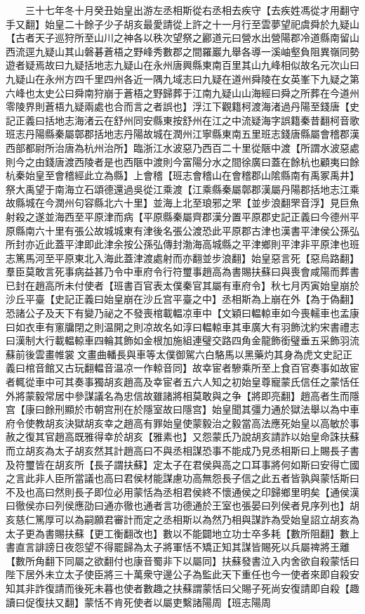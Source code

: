 　　三十七年冬十月癸丑始皇出游左丞相斯從右丞相去疾守【去疾姓馮從才用翻守手又翻】始皇二十餘子少子胡亥最愛請從上許之十一月行至雲夢望祀虞舜於九疑山【古者天子巡狩所至山川之神各以秩次望祭之酈道元曰營水出營陽郡冷道縣南留山西流逕九疑山其山磐碁蒼梧之野峰秀數郡之間羅巖九舉各導一溪岫壑負阻異嶺同勢遊者疑焉故曰九疑括地志九疑山在永州唐興縣東南百里其山九峰相似故名元次山曰九疑山在永州方四千里四州各近一隅九域志曰九疑在道州舜陵在女英峯下九疑之第六峰也太史公曰舜南狩崩于蒼梧之野歸葬于江南九疑山山海經曰舜之所葬在今道州零陵界則蒼梧九疑兩處也合而言之者誤也】浮江下觀籍柯渡海渚過丹陽至錢唐【史記正義曰括地志海渚云在舒州同安縣東按舒州在江之中流疑海字誤籍秦昔翻柯音歌班志丹陽縣秦屬鄣郡括地志丹陽故城在潤州江寧縣東南五里班志錢唐縣屬會稽郡漢西部都尉所治唐為杭州治所】臨浙江水波惡乃西百二十里從陿中渡【所謂水波惡處則今之由錢唐渡西陵者是也西陿中渡則今富陽分水之間徐廣曰蓋在餘杭也顧夷曰餘杭秦始皇至會稽經此立為縣】上會稽【班志會稽山在會稽郡山隂縣南有禹冢禹井】祭大禹望于南海立石頌德還過吳從江乘渡【江乘縣秦屬鄣郡漢屬丹陽郡括地志江乘故縣城在今潤州句容縣北六十里】並海上北至琅邪之罘【並步浪翻罘音浮】見巨魚射殺之遂並海西至平原津而病【平原縣秦屬齊郡漢分置平原郡史記正義曰今德州平原縣南六十里有張公故城城東有津後名張公渡恐此平原郡古津也漢書平津侯公孫弘所封亦近此蓋平津即此津余按公孫弘傳封渤海高城縣之平津鄉則平津非平原津也班志篤馬河至平原東北入海此蓋津渡處射而亦翻並步浪翻】始皇惡言死【惡烏路翻】羣臣莫敢言死事病益甚乃令中車府令行符璽事趙高為書賜扶蘇曰與喪會咸陽而葬書已封在趙高所未付使者【班書百官表太僕秦官其屬有車府令】秋七月丙寅始皇崩於沙丘平臺【史記正義曰始皇崩在沙丘宫平臺之中】丞相斯為上崩在外【為于偽翻】恐諸公子及天下有變乃祕之不發喪棺載輼凉車中【文穎曰輼輬車如今喪轜車也孟康曰如衣車有窻牖閉之則温開之則凉故名如淳曰輼輬車其車廣大有羽飾沈約宋書禮志曰漢制大行載輼輬車四輪其飾如金根加施組連璧交路四角金龍飾銜璧垂五采飾羽流蘇前後雲畫帷裳文畫曲轓長與車等太僕御駕六白駱馬以黑藥灼其身為虎文史記正義曰棺音館又古玩翻輼音温凉一作輬音同】故幸宦者驂乘所至上食百官奏事如故宦者輒從車中可其奏事獨胡亥趙高及幸宦者五六人知之初始皇尊寵蒙氏信任之蒙恬任外將蒙毅常居中參謀議名為忠信故雖諸將相莫敢與之争【將即亮翻】趙高者生而隱宫【康曰餘刑顯於市朝宫刑在於隱室故曰隱宫】始皇聞其彊力通於獄法舉以為中車府令使教胡亥決獄胡亥幸之趙高有罪始皇使蒙毅治之毅當高法應死始皇以高敏於事赦之復其官趙高既雅得幸於胡亥【雅素也】又怨蒙氏乃說胡亥請詐以始皇命誅扶蘇而立胡亥為太子胡亥然其計趙高曰不與丞相謀恐事不能成乃見丞相斯曰上賜長子書及符璽皆在胡亥所【長子謂扶蘇】定太子在君侯與高之口耳事將何如斯曰安得亡國之言此非人臣所當議也高曰君侯材能謀慮功高無怨長子信之此五者皆孰與蒙恬斯曰不及也高曰然則長子即位必用蒙恬為丞相君侯終不懷通侯之印歸鄉里明矣【通侯漢曰徹侯亦曰列侯應劭曰通亦徹也通者言功德通於王室也張晏曰列侯者見序列也】胡亥慈仁篤厚可以為嗣願君審計而定之丞相斯以為然乃相與謀詐為受始皇詔立胡亥為太子更為書賜扶蘇【更工衡翻改也】數以不能闢地立功士卒多耗【數所阻翻】數上書直言誹謗日夜怨望不得罷歸為太子將軍恬不矯正知其謀皆賜死以兵屬禆將王離【數所角翻下同屬之欲翻付也康音蜀非下以屬同】扶蘇發書泣入内舍欲自殺蒙恬曰陛下居外未立太子使臣將三十萬衆守邊公子為監此天下重任也今一使者來即自殺安知其非詐復請而後死未暮也使者數趣之扶蘇謂蒙恬曰父賜子死尚安復請即自殺【趣讀曰促復扶又翻】蒙恬不肯死使者以屬吏繫諸陽周【班志陽周